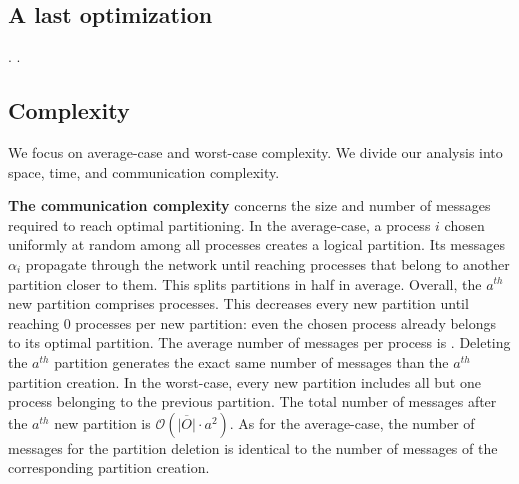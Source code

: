 \subsection{A last optimization}
 . .

\subsection{Complexity}
\label{subsec:complexity}


We focus on average-case and worst-case complexity. We divide our
analysis into space, time, and communication complexity.

\textbf{The communication complexity} concerns the size and number of
messages required to reach optimal partitioning. In the average-case,
a process $i$ chosen uniformly at random among all processes creates a
logical partition. Its messages $\alpha_i$ propagate through the
network until reaching processes that belong to another partition
closer to them. This splits partitions in half in average. Overall,
the $a^{th}$ new partition comprises
processes. This decreases every new partition until reaching $0$
processes per new partition: even the chosen process already belongs
to its optimal partition. The average number of messages per process
is .  Deleting the
$a^{th}$ partition generates the exact same number of messages than
the $a^{th}$ partition creation.  In the
worst-case, every new partition includes all but one process belonging
to the previous partition. The total number of messages after the
$a^{th}$ new partition is $\mathcal{O}(\overline{|O|}\cdot a^2)$. As
for the average-case, the number of messages for the partition
deletion is identical to the number of messages of the corresponding
partition creation.

